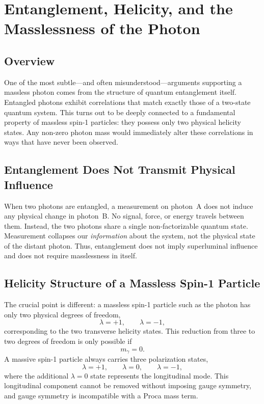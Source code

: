 
\section{Entanglement, Helicity, and the Masslessness of the Photon}
\label{sec:entanglement_masslessness}

\subsection*{Overview}
One of the most subtle---and often misunderstood---arguments supporting a 
massless photon comes from the structure of quantum entanglement itself. 
Entangled photons exhibit correlations that match exactly those of a 
two-state quantum system. This turns out to be deeply connected to a 
fundamental property of massless spin-1 particles: they possess only two 
physical helicity states. Any non-zero photon mass would immediately alter 
these correlations in ways that have never been observed.

\subsection*{Entanglement Does Not Transmit Physical Influence}
When two photons are entangled, a measurement on photon~A does not induce 
any physical change in photon~B. No signal, force, or energy travels between 
them. Instead, the two photons share a single non-factorizable quantum 
state. Measurement collapses our \emph{information} about the system, not 
the physical state of the distant photon. Thus, entanglement does not imply 
superluminal influence and does not require masslessness in itself.

\subsection*{Helicity Structure of a Massless Spin-1 Particle}
The crucial point is different: a massless spin-1 particle such as the 
photon has only two physical degrees of freedom,
\[
\lambda = +1, \qquad \lambda = -1,
\]
corresponding to the two transverse helicity states.  
This reduction from three to two degrees of freedom is only possible if
\[
m_\gamma = 0.
\]
A massive spin-1 particle always carries three polarization states,
\[
\lambda = +1, \qquad \lambda = 0, \qquad \lambda = -1,
\]
where the additional $\lambda=0$ state represents the longitudinal mode.
This longitudinal component cannot be removed without imposing 
gauge symmetry, and gauge symmetry is incompatible with a Proca mass term.

